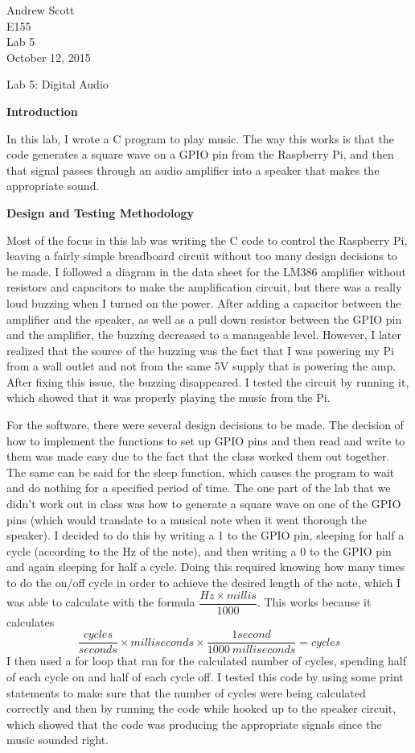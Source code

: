 \documentclass[11pt,letterpaper]{article}
\begin{document}
\begin{flushright}
Andrew Scott\\
E155\\
Lab 5\\
October 12, 2015
\end{flushright}

\begin{center}
Lab 5: Digital Audio
\end{center}

\noindent\textbf{Introduction}

In this lab, I wrote a C program to play music. The way this works is that the code generates a square wave on a GPIO pin from the Raspberry Pi, and then that signal passes through an audio amplifier into a speaker that makes the appropriate sound.

\noindent\textbf{Design and Testing Methodology}

Most of the focus in this lab was writing the C code to control the Raspberry Pi, leaving a fairly simple breadboard circuit without too many design decisions to be made. I followed a diagram in the data sheet for the LM386 amplifier without resistors and capacitors to make the amplification circuit, but there was a really loud buzzing when I turned on the power. After adding a capacitor between the amplifier and the speaker, as well as a pull down resistor between the GPIO pin and the amplifier, the buzzing decreased to a manageable level. However, I later realized that the source of the buzzing was the fact that I was powering my Pi from a wall outlet and not from the same 5V supply that is powering the amp. After fixing this issue, the buzzing disappeared. I tested the circuit by running it, which showed that it was properly playing the music from the Pi.

For the software, there were several design decisions to be made. The decision of how to implement the functions to set up GPIO pins and then read and write to them was made easy due to the fact that the class worked them out together. The same can be said for the sleep function, which causes the program to wait and do nothing for a specified period of time. The one part of the lab that we didn't work out in class was how to generate a square wave on one of the GPIO pins (which would translate to a musical note when it went thorough the speaker). I decided to do this by writing a 1 to the GPIO pin, sleeping for half a cycle (according to the Hz of the note), and then writing a 0 to the GPIO pin and again sleeping for half a cycle. Doing this required knowing how many times to do the on/off cycle in order to achieve the desired length of the note, which I was able to calculate with the formula $\dfrac{Hz \times millis}{1000}$. This works because it calculates
$$ \dfrac{cycles}{seconds} \times {milliseconds} \times \dfrac{1 second}{1000 \ milliseconds} = cycles$$ I then used a for loop that ran for the calculated number of cycles, spending half of each cycle on and half of each cycle off. I tested this code by using some print statements to make sure that the number of cycles were being calculated correctly and then by running the code while hooked up to the speaker circuit, which showed that the code was producing the appropriate signals since the music sounded right.
\end{document}
